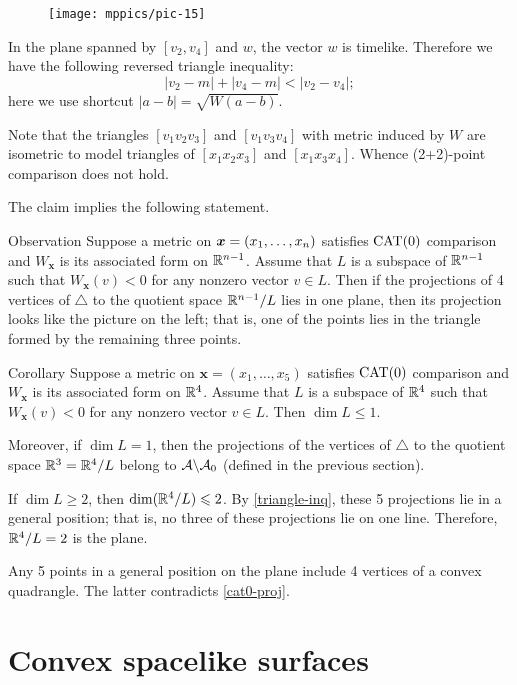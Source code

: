 \documentclass{article}
\begin{document}
\begin{wrapfigure}{r}{33mm}
\vskip-4mm
\centering
\texttt{[image: mppics/pic-15]}
\end{wrapfigure}

In the plane spanned by $[v_2,v_4]$ and $w$, the vector $w$ is timelike.
Therefore we have the following reversed triangle inequality:
\[|v_2-m|+|v_4-m|<|v_2-v_4|;\]
here we use shortcut $|a-b|=\sqrt{W(a-b)}$.

Note that the triangles $[v_1v_2v_3]$ and $[v_1v_3v_4]$ with metric induced by $W$ are isometric to model triangles of $[x_1x_2x_3]$ and $[x_1x_3x_4]$.
Whence (2+2)-point comparison does not hold.
\qeds


The claim implies the following statement.


\begin{thm}{Observation}\label{cat0-proj}
Suppose a metric on $\bm{x}\z=(x_1,\dots,x_n)$ satisfies $\mathrm{CAT}(0)$ comparison
and $W_{\bm{x}}$ is its associated form on $\mathbb{R}^{n-1}$.
Assume that $L$ is a subspace of $\mathbb{R}^{n-1}$ such that
$W_{\bm{x}}(v)< 0$ for any nonzero vector $v\in L$.
Then if the projections of 4 vertices of $\triangle$ to the quotient space $\mathbb{R}^{n-1}/L$ lies in one plane, then its projection looks like the picture on the left;
that is, one of the points lies in the triangle formed by the remaining three points.
\end{thm}

\begin{thm}{Corollary}\label{cor:3+2}
Suppose a metric on $\bm{x}=(x_1,\dots,x_5)$ satisfies $\mathrm{CAT}(0)$ comparison
and $W_{\bm{x}}$ is its associated form on $\mathbb{R}^{4}$.
Assume that $L$ is a subspace of $\mathbb{R}^{4}$ such that
$W_{\bm{x}}(v)< 0$ for any nonzero vector $v\in L$.
Then $\dim L\le 1$.

Moreover, if $\dim L= 1$, then the projections of the vertices of $\triangle$ to the quotient space $\mathbb{R}^3=\mathbb{R}^4/L$ belong to $\mathcal{A}\backslash\mathcal{A}_0$ (defined in the previous section). 
\end{thm}

If $\dim L\ge 2$, then $\mathop{\rm dim}\nolimits (\mathbb{R}^4/L)\leqslant 2$.
By \ref{triangle-inq}, these 5 projections lie in a general position; that is, no three of these projections lie on one line. 
Therefore, $\mathbb{R}^4/L=2$ is the plane.

Any 5 points in a general position on the plane include 4 vertices of a convex quadrangle.
The latter contradicts \ref{cat0-proj}.
\qeds

\section{Convex spacelike surfaces}
\end{document}
